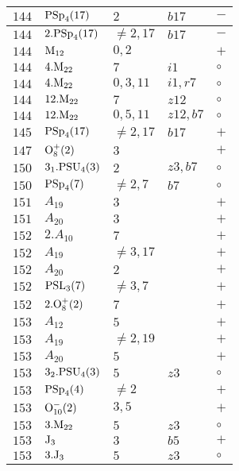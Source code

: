 \documentclass[a4paper, 11pt]{article}
\begin{document}
\begin{longtable}{lllll}
		$144$ & ${\rm PSp}_{4}(17)$ & $2$ & $b17$ & $-$ \\ \hline
		$144$ & $2.{\rm PSp}_{4}(17)$ & $\neq 2,17$ & $b17$ & $-$ \\ \hline
		$144$ & ${\rm M}_{12}$ & $0, 2$ &  & $+$ \\ \hline
		$144$ & $4.{\rm M}_{22}$ & $7$ & $i1$ & $\circ$ \\ \hline
		$144$ & $4.{\rm M}_{22}$ & $0,3,11$ & $i1, r7$ & $\circ$ \\ \hline
		$144$ & $12.{\rm M}_{22}$ & $7$ & $z12$ & $\circ$ \\ \hline
		$144$ & $12.{\rm M}_{22}$ & $0,5,11$ & $z12, b7$ & $\circ$ \\ \hline
		$145$ & ${\rm PSp}_{4}(17)$ & $\neq 2,17$ & $b17$ & $+$ \\ \hline
		$147$ & ${\rm O}_{8}^+(2)$ & $3$ &  & $+$ \\ \hline
		$150$ & $3_1.{\rm PSU}_{4}(3)$ & $2$ & $z3, b7$ & $\circ$ \\ \hline
		$150$ & ${\rm PSp}_{4}(7)$ & $\neq 2,7$ & $b7$ & $\circ$ \\ \hline
		$151$ & $A_{19}$ & $3$ &  & $+$ \\ \hline
		$151$ & $A_{20}$ & $3$ &  & $+$ \\ \hline
		$152$ & $2.A_{10}$ & $7$ &  & $+$ \\ \hline
		$152$ & $A_{19}$ & $\neq 3,17$ &  & $+$ \\ \hline
		$152$ & $A_{20}$ & $2$ &  & $+$ \\ \hline
		$152$ & ${\rm PSL}_{3}(7)$ & $\neq 3,7$ &  & $+$ \\ \hline
		$152$ & $2.{\rm O}_{8}^+(2)$ & $7$ &  & $+$ \\ \hline
		$153$ & $A_{12}$ & $5$ &  & $+$ \\ \hline
		$153$ & $A_{19}$ & $\neq 2,19$ &  & $+$ \\ \hline
		$153$ & $A_{20}$ & $5$ &  & $+$ \\ \hline
		$153$ & $3_2.{\rm PSU}_{4}(3)$ & $5$ & $z3$ & $\circ$ \\ \hline
		$153$ & ${\rm PSp}_{4}(4)$ & $\neq 2$ &  & $+$ \\ \hline
		$153$ & ${\rm O}_{10}^-(2)$ & $3, 5$ &  & $+$ \\ \hline
		$153$ & $3.{\rm M}_{22}$ & $5$ & $z3$ & $\circ$ \\ \hline
		$153$ & ${\rm J}_3$ & $3$ & $b5$ & $+$ \\ \hline
		$153$ & $3.{\rm J}_3$ & $5$ & $z3$ & $\circ$ \\ \hline

\end{longtable}
\end{document}
